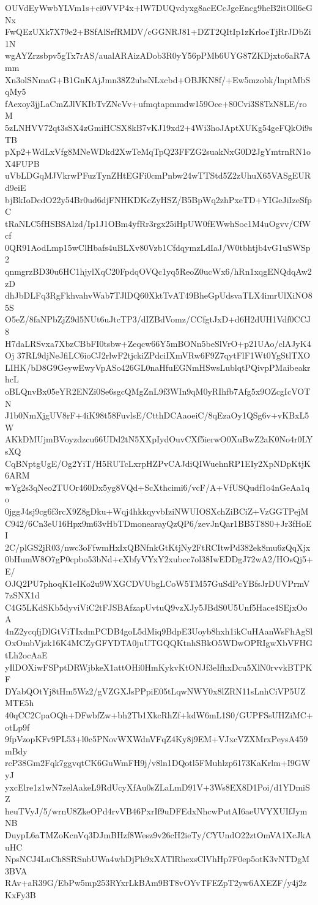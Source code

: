 OUVdEyWwbYLVm1s+ci0VVP4x+lW7DUQvdyxg8acECcJgeEncg9heB2itOll6eGNx
FwQEzUXk7X79e2+BSfAlSrfRMDV/cGGNRJ81+DZT2QItIp1zKrloeTjRrJDbZi1N
wgAYZrzsbpv5gTx7rAS/aualARAizADob3R0yY56pPMb6UYG87ZKDjxto6aR7Amm
Xn3olSNmaG+B1GnKAjJmn38Z2ubsNLxcbd+OBJKN8f/+Ew5mzobk/lnptMbSqMy5
fAexoy3jjLaCmZJlVKIbTvZNcVv+ufmqtapmmdw159Oce+80Cvi3S8TzN8LE/roM
5zLNHVV72qt3sSX4zGmiHCSX8kB7vKJ19xd2+4Wi3hoJAptXUKg54geFQkOi9sTB
pXp2+WdLxVfg8MNeWDkd2XwTeMqTpQ23FFZG2suakNxG0D2JgYmtrnRN1oX4FUPB
uVbLDGqMJVkrwPFuzTynZHtEGFi0cmPnbw24wTTStd5Z2zUhuX65VASgEURd9eiE
bjBkIoDcdO22y54Br0ud6djFNHKDKcZyHSZ/B5BpWq2zhPxeTD+YIGeJiIzeSfpC
tRaNLC5fHSBSAlzd/Ip1J1OBm4yfRr3rgx25iHpUW0fEWwhSoc1M4uOgvv/CfWcf
0QR91AodLmp15wClHbafs4uBLXv80Vzb1CfdqymzLdIaJ/W0tbhtjb4vG1uSWSp2
qnmgrzBD30u6HC1hjylXqC20FpdqOVQc1yq5ReoZ0ucWx6/hRn1xqgENQdqAw2zD
dhJbDLFq3RgFkhvahvWab7TJlDQ60XktTvAT49BheGpUdsvaTLX4imrUlXiNO85S
O5eZ/8faNPbZjZ9d5NUt6uJtcTP3/dIZBdVomz/CCfgtJxD+d6H2dUH1Vdf0CCJ8
H7daLRSvxa7XbzCBbFI0tsbw+Zeqcw66Y5mBONn5beSlVrO+p21UAo/clAJyK4Oj
37RL9djNeJfiLC6ioCJ2rlwF2tjckiZPdciIXmVRw6F9Z7qytFlF1Wt0YgStlTXO
LIHK/bD8G9GeywEwyVpASo426GL0naHfuEGNmHSwsLublqtPQivpPMaibeakrhcL
oBLQnvBx05eYR2ENZi0Se6sgcQMgZnL9f3WIn9qM0yRIhfb7Afg5x9OZcgIcVOTN
J1b0NmXjgUV8rF+4iK98t58FuvlsE/CtthDCAaoeiC/8qEzaOy1QSg6v+vKBxL5W
AKkDMUjmBVoyzdzcu66UDd2tN5XXpIydOuvCXf5ierwO0XuBwZ2aK0No4r0LYsXQ
CqBNptgUgE/Og2YiT/H5RUTcLxrpHZPvCAJdiQIWuehnRP1EIy2XpNDpKtjK6ARM
wYg2s3qNeo2TUOr460Dx5yg8VQd+ScXthcimi6/vcF/A+VfUSQudf1o4nGeAa1qo
0jggJ4sj9cg6f3rcX9Z8gDku+Wqj4hkkqyvbIziNWUIOSXchZiBCiZ+VzGGTPejM
C942/6Cn3eU16Hpx9m63vHbTDmonearayQzQP6/zevJnQar1BB5T8S0+Jr3fHoEI
2C/plGS2jR03/nwc3oFfwmHxIxQBNfnkGtKtjNy2FtRCItwPd382ek8mu6zQqXjx
0bHumW8O7gP0cpbo53bNd+cXbfyVYxY2xubcc7ol38IwEDDgJ72wA2/HOsQj5+E/
OJQ2PU7phoqK1eIKo2u9WXGCDVUbgLCoW5TM57GuSdPcYBfsJrDUVPrmV7zSNX1d
C4G5LKdSKb5dyviViC2tFJSBAfzapUvtuQ9vzXJy5JBdS0U5Unf5Hace4SEjxOoA
4nZ2ycqfjDlGtViTIxdmPCDB4goL5dMiq9BdpE3Uoyb8hxh1ikCuHAanWsFhAgSl
OxOmbVjzk16K4MCZyGFYDTA0juUTGQQKtnhSBkO5WDwOPRIgwXbVFHGtLh2ocAaE
yIlDOXiwFSPptDRWjbkeX1attOHi0HmKykvKtONJf3eIfhxDcu5XlN0rvvkBTPKF
DYabQOtYj8tHm5Wz2/gVZGXJsPPpiE05tLqwNWY0x8lZRN11sLnhCiVP5UZMTE5h
40qCC2CpaOQh+DFwbfZw+bh2Tb1XkcRhZf+kdW6mL1S0/GUPFSsUHZiMC+otLp9f
9fpVzopKFv9PL53+l0c5PNovWXWdnVFqZ4Ky8j9EM+VJxcVZXMrxPeysA459mBdy
rcP38Gm2Fqk7ggvqtCK6GuWmFH9j/v8ln1DQotl5FMuhlzp6173KaKrlm+I9GWyJ
yxcElre1z1wN7zelAakeL9RdUcyXfAu0sZLaLmD91V+3Ws8EX8D1Poi/d1YDmiSZ
heuTVyJ/5/wrnU8ZkeOPd4rvVB46PxrIf9uDFEdxNhcwPutAI6aeUVYXUIfJymNB
DuypL6aTMZoKcnVq3DJmBHzf8Wesz9v26cH2ieTy/CYUndO22ztOmVA1XcJkAuHC
NpsNCJ4LuCh8SRSnbUWa4whDjPh9xXATlRhexsClVhHp7F0ep5otK3vNTDgM3BVA
RAv+aR39G/EbPw5mp253RYxrLkBAm9BT8vOYvTFEZpT2yw6AXEZF/y4j2zKxFy3B

